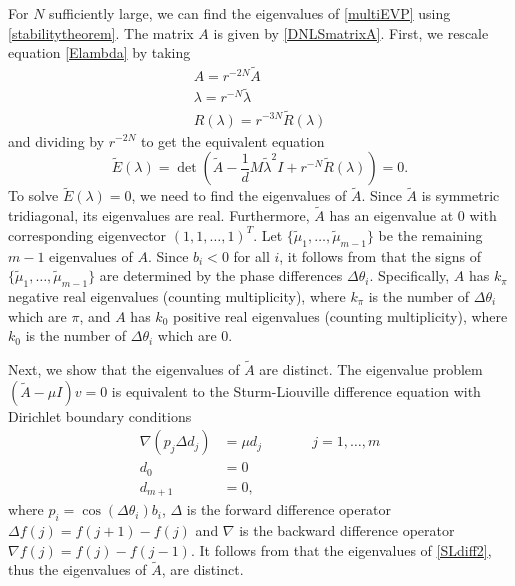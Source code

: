 \documentclass[12pt]{elsarticle}
\begin{document}
For $N$ sufficiently large, we can find the eigenvalues of \cref{multiEVP} using \cref{stabilitytheorem}. The matrix $A$ is given by \cref{DNLSmatrixA}. First, we rescale equation \cref{Elambda} by taking
\begin{align*}
A = r^{-2N} \tilde{A} \\
\lambda = r^{-N} \tilde{\lambda} \\
R(\lambda) = r^{-3N} \tilde{R}(\lambda)
\end{align*}
and dividing by $r^{-2N}$ to get the equivalent equation
\begin{equation}\label{DNLStildeE}
\tilde{E}(\lambda) = 
\det\left(\tilde{A} - \frac{1}{d}M \tilde{\lambda}^2 I + r^{-N} \tilde{R}(\lambda)\right) = 0.
\end{equation}
To solve $\tilde{E}(\lambda) = 0$, we need to find the eigenvalues of $\tilde{A}$. Since $\tilde{A}$ is symmetric tridiagonal, its eigenvalues are real. Furthermore, $\tilde{A}$ has an eigenvalue at 0 with corresponding eigenvector $(1, 1, \dots, 1)^T$. Let $\{ \tilde{\mu}_1, \dots, \tilde{\mu}_{m-1}\}$ be the remaining $m-1$ eigenvalues of $A$. Since $b_i < 0$ for all $i$, it follows from \cite[Lemma 5.4]{Sandstede1998} that the signs of $\{ \tilde{\mu}_1, \dots, \tilde{\mu}_{m-1}\}$ are determined by the phase differences $\Delta\theta_i$. Specifically, $A$ has $k_\pi$ negative real eigenvalues (counting multiplicity), where $k_\pi$ is the number of $\Delta\theta_i$ which are $\pi$, and $A$ has $k_0$ positive real eigenvalues (counting multiplicity), where $k_0$ is the number of $\Delta\theta_i$ which are $0$. 

Next, we show that the eigenvalues of $\tilde{A}$ are distinct. The eigenvalue problem $(\tilde{A} - \mu I)v = 0$ is equivalent to the Sturm-Liouville difference equation with Dirichlet boundary conditions
\begin{equation}\label{SLdiff2}
\begin{aligned}
\nabla( p_j \Delta d_j ) &= \mu d_j && \qquad j = 1, \dots, m \\
d_0 &= 0 \\
d_{m+1} &= 0,
\end{aligned}
\end{equation}
where $p_i = \cos(\Delta\theta_i) b_i$, $\Delta$ is the forward difference operator $\Delta f(j) = f(j+1) - f(j)$ and $\nabla$ is the backward difference operator $\nabla f(j) = f(j) - f(j-1)$. It follows from \cite[Corollary 2.2.7]{Jirari1995} that the eigenvalues of \cref{SLdiff2}, thus the eigenvalues of $\tilde{A}$, are distinct.
\end{document}
